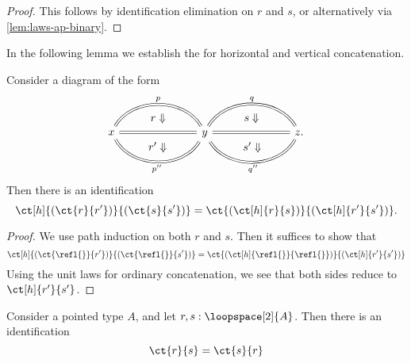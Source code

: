 \begin{proof}
  This follows by identification elimination on $r$ and $s$, or alternatively via \cref{lem:laws-ap-binary}.
\end{proof}

In the following lemma we establish the  for horizontal and vertical concatenation.

\begin{lem}\label{lem:interchange-law}
Consider a diagram of the form
\begin{equation*}
\begin{tikzcd}[column sep=7em]
x \arrow[r,equals,bend left=60,"p",""{name=A,below}] \arrow[r,equals,""{name=B},""{name=E,below}] \arrow[r,equals,bend right=60,"{p''}"{below},""{name=F,above}] \arrow[from=A,to=B,phantom,"r\Downarrow"] \arrow[from=E,to=F,phantom,"{r'\Downarrow}"] 
& y \arrow[r,equals,bend left=60,"q",""{name=C,below}] \arrow[r,equals,""{name=G,above},""{name=H,below}] \arrow[r,equals,bend right=60,""{name=D,above},"{q''}"{below}] \arrow[from=C,to=G,phantom,"s\Downarrow"] \arrow[from=H,to=D,phantom,"{s'\Downarrow}"] & z.
\end{tikzcd}
\end{equation*}
Then there is an identification
\begin{equation*}
  \ct[h]{(\ct{r}{r'})}{(\ct{s}{s'})}=\ct{(\ct[h]{r}{s})}{(\ct[h]{r'}{s'})}.
\end{equation*}
\end{lem}

\begin{proof}
  We use path induction on both $r$ and $s$. Then it suffices to show that
  \begin{equation*}
    \ct[h]{(\ct{\refl{}}{r'})}{(\ct{\refl{}}{s'})}=\ct{(\ct[h]{\refl{}}{\refl{}})}{(\ct[h]{r'}{s'})}
  \end{equation*}
  Using the unit laws for ordinary concatenation, we see that both sides reduce to $\ct[h]{r'}{s'}$.
\end{proof}

\begin{thm}
  Consider a pointed type $A$, and let $r,s:\loopspace[2]{A}$. Then there is an identification
  \begin{equation*}
    \ct{r}{s}=\ct{s}{r}
  \end{equation*}
\end{thm}

